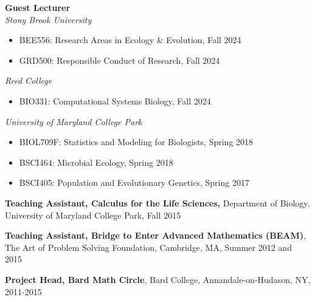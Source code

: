 \documentclass[]{res}
\begin{document}
\begin{resume}
{\bf Guest Lecturer} \\
\emph{Stony Brook University}
\begin{itemize} \itemsep -2pt
\item BEE556: Research Areas in Ecology \& Evolution, Fall 2024
\item GRD500: Responsible Conduct of Research, Fall 2024
\end{itemize}
\emph{Reed College}
\begin{itemize} \itemsep -2pt
\item BIO331: Computational Systems Biology, Fall 2024
\end{itemize}
\emph{University of Maryland College Park}
\begin{itemize} \itemsep -2pt
\item BIOL709F: Statistics and Modeling for Biologists, Spring 2018
\item BSCI464: Microbial Ecology, Spring 2018 
\item BSCI405: Population and Evolutionary Genetics, Spring 2017
\end{itemize}

{\bf Teaching Assistant, Calculus for the Life Sciences,} Department of Biology, University of Maryland College Park, Fall 2015%

{\bf Teaching Assistant, Bridge to Enter Advanced Mathematics (BEAM)}, The Art of Problem Solving Foundation, Cambridge, MA, Summer 2012 and 2015 %

{\bf Project Head, Bard Math Circle}, Bard College, Annandale-on-Hudason, NY, 2011-2015


\end{resume}
\end{document}
